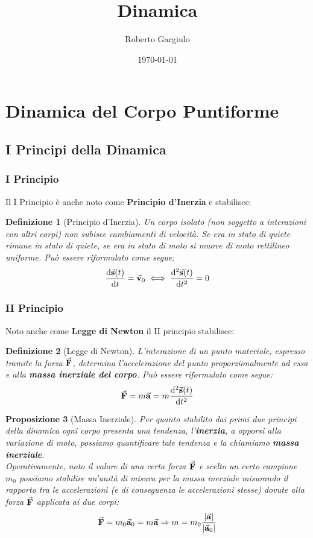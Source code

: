 \documentclass{article}
\title{Dinamica}
\author{Roberto Gargiulo}
\date{\today}
\newtheorem{defn}{Definizione}[section]
\newtheorem{prop}[defn]{Proposizione}
\newcommand{\then}{\ensuremath{\Rightarrow}}
\renewcommand{\a}{\va{a}}
\renewcommand{\v}{\va{v}}
\newcommand{\s}{\va{s}}
\newcommand{\F}{\va{F}}
\begin{document}
\maketitle
\tableofcontents
\pagebreak


\section{Dinamica del Corpo Puntiforme}

\subsection{I Principi della Dinamica}

\subsubsection{I Principio}
Il I Principio è anche noto come \textbf{Principio d'Inerzia} e stabilisce:
\begin{defn}[Principio d'Inerzia]
Un corpo isolato (non soggetto a interazioni con altri corpi) non subisce cambiamenti di velocità. Se era in stato di quiete rimane in stato di quiete, se era in stato di moto si muove di moto rettilineo uniforme.
Può essere riformulato come segue:
\[ \dv{\s(t)}{t}=\v_0 \iff \dv[2]{\s(t)}{t}=0\]
\end{defn}



\subsubsection{II Principio}

Noto anche come \textbf{Legge di Newton} il II principio stabilisce:
\begin{defn}[Legge di Newton]
L'interazione di un punto materiale, espresso tramite la forza $\F$, determina l'accelerazione del punto proporzionalmente ad essa e alla \textbf{massa inerziale del corpo}. Può essere riformulato come segue:
\[\F=m\a=m\dv[2]{\s(t)}{t}\]
\end{defn}

\begin{prop}[Massa Inerziale]
Per quanto stabilito dai primi due principi della dinamica ogni corpo presenta una tendenza, l'\textbf{inerzia}, a opporsi alla variazione di moto, possiamo quantificare tale tendenza e la chiamiamo \textbf{massa inerziale}.\\
Operativamente, noto il valore di una certa forza $\F$ e scelto un certo campione $m_0$ possiamo stabilire un'unità di misura per la massa inerziale misurando il rapporto tra le accelerazioni (e di conseguenza le accelerazioni stesse) dovute alla forza $\F$ applicata ai due corpi:
\[\F=m_0\a_0=m\a\then m=m_0\frac{|\a|}{|\a_0|}\]
\end{prop}
\end{document}
